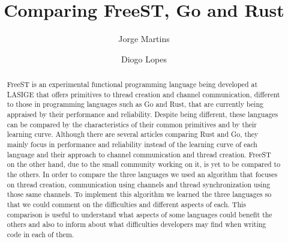 \documentclass[runningheads]{llncs}
\begin{document}
\title{Comparing FreeST, Go and Rust}
\author{Jorge Martins \and
Diogo Lopes
}
\nocite{*}
\maketitle
\thispagestyle{empty}
\begin{abstract}
FreeST is an experimental functional programming language being developed at LASIGE that offers primitives to thread creation and channel communication, different to those in programming languages such as Go and Rust, that are currently being appraised by their performance and reliability. Despite being different, these languages can be compared by the characteristics of their common primitives and by their learning curve. Although there are several articles comparing Rust and Go, they mainly focus in performance and reliability instead of the learning curve of each language and their approach to channel communication and thread creation. FreeST on the other hand, due to the small community working on it, is yet to be compared to the others.
In order to compare the three languages we used an algorithm that focuses on thread creation, communication using channels and thread synchronization using those same channels. To implement this algorithm we learned the three languages so that we could comment on the difficulties and different aspects of each.
This comparison is useful to understand what aspects of some languages could benefit the others and also to inform about what difficulties developers may find when writing code in each of them.
\end{abstract}
\end{document}
